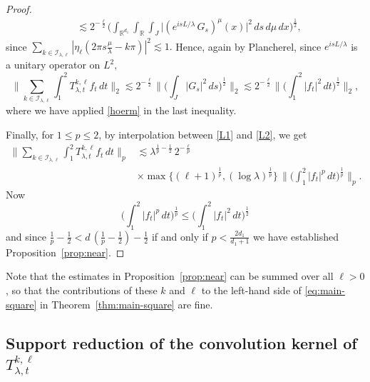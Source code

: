 \documentclass[leqno]{amsart}
\theoremstyle{definition}
\theoremstyle{remark}
\numberwithin{equation}{section}
\newcommand{\R}{\mathbb{R}}
\newcommand\lc{\lesssim}
\newcommand\la{{\lambda}}
\begin{document}
\begin{proof}
\begin{align*}
&\lesssim 2^{-\frac \ell 2} \Big( \int_{\R^{d_1}}\int_{\R}   \int_J \Big|(e^{isL/\la} \, G_s)^\mu(x) \Big|^2 \, ds \,d\mu \, dx\Big)^{\frac{1}{2}},
\end{align*} 
since $\sum_{k\in\mathcal I_{\lambda,\ell}} |\eta_\ell(2\pi s\tfrac{\mu}{\lambda}-k\pi)|^2 \lesssim 1.$
Hence, again by Plancherel, since $e^{isL/\la}$ is a unitary operator on $L^2,$ 
\begin{equation}\label{L2} 
\Big\| \sum_{k\in\mathcal I_{\lambda,\ell}} 
\int_1^2 T^{k,\ell}_{\la,t}f_t \, dt \Big\|_2 \lesssim 2^{-\frac \ell 2}\Big\|\Big(\int_J |G_s|^2 \,ds\Big)^{\frac 12}\Big\|_2
\lesssim 2^{-\frac \ell 2}\Big\|\Big(\int_1^2 |f_t|^2 \,dt\Big)^{\frac 12}\Big\|_2,
\end{equation} 
where we have applied \eqref{hoerm} in the last inequality.

Finally, for $1\le p\le 2$, by interpolation between \eqref{L1} and \eqref{L2}, we get
\begin{align*}\Big\| \sum_{k\in\mathcal I_{\lambda,\ell}} 
\int_1^2 T^{k,\ell}_{\la,t}f_t \, dt \Big\|_p
& \lc \la^{\frac 1p-\frac 12} \, 2^{-\frac \ell p} 
 \\
& \times \max \big\{(\ell + 1)^{\frac{1}{p}} , (\log \la)^{\frac{1}{p}}\big\} \, \Big\| \Big(\int_1^2 | f_t|^p \, dt\Big)^{\frac{1}{p}} \Big\|_p .
\end{align*}
Now 
\[
\Big(\int_1^2 | f_t|^p \, dt\Big)^{\frac{1}{p}}\le
\Big(\int_1^2 | f_t|^2 \, dt\Big)^{\frac{1}{2}}
\]
and since 
$ \tfrac 1p-\tfrac 12 < d\,(\frac 1p-\frac 12)-\tfrac 12$ {if and only if} $p< \tfrac{2d_1}{d_1+1}$
we have established  Proposition~\ref{prop:near}. 
\end{proof}

Note that the estimates in Proposition~\ref{prop:near} can be summed over all $\ell>0$, so that the contributions of these $k$ and $\ell$ to the left-hand side of \eqref{eq:main-square} in Theorem~\ref{thm:main-square} are fine.


\subsection{Support reduction of the convolution kernel of $T_{\lambda,t}^{k,\ell}$}\label{decay}
\end{document}
